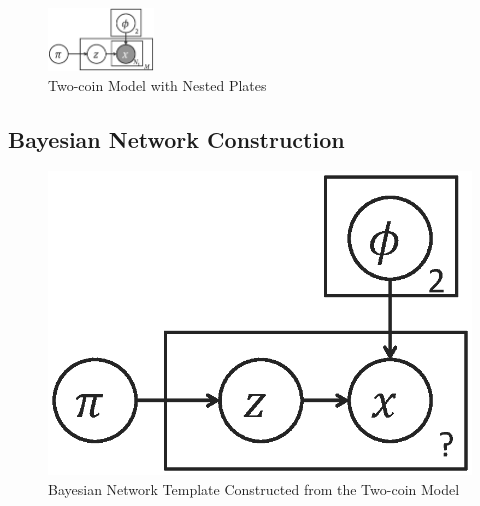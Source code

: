 \begin{figure}[th]
	\centering
	\includegraphics[width=0.25\textwidth]{figs/two_coins_nestedplates}
	\caption{Two-coin Model with Nested Plates}
	\label{fig:two_coins_nestedplates}
\end{figure}

\subsection{Bayesian Network Construction}

\begin{figure}[h]
\centering
\includegraphics[scale=0.4]{figs/two_coins_bn1.eps}
\caption{Bayesian Network Template Constructed from the Two-coin Model}
\label{fig:two_coins_bn1}
\end{figure}


